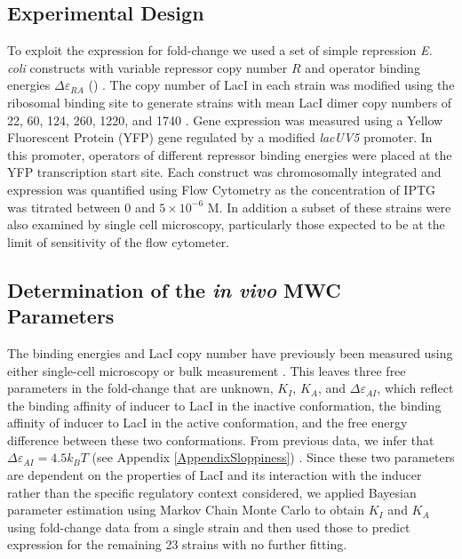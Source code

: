 \subsection*{Experimental Design}

To exploit the expression for fold-change \eref[eq7] we used a set of simple
repression \textit{E. coli} constructs with variable repressor copy number $R$
and operator binding energies $\Delta\varepsilon_{RA}$
(\fref[figpolymeraseRepressorStates]) .  The copy number of LacI in each strain was modified using
the ribosomal binding site to generate strains with mean LacI dimer copy numbers
of 22, 60, 124, 260, 1220, and 1740 \cite{Garcia2011}. Gene expression was
measured using a Yellow Fluorescent Protein (YFP) gene regulated by a modified
\textit{lacUV5} promoter. In this promoter, operators of different repressor
binding energies were placed at the YFP transcription start site. Each construct
was chromosomally integrated and expression was quantified using Flow Cytometry
as the concentration of IPTG was titrated between 0 and $5\times
10^{-6}\,\,\text{M}$. In addition a subset of these strains were also examined
by single cell microscopy, particularly those expected to be at the limit of
sensitivity of the flow cytometer.

\subsection*{Determination of the \textit{in vivo} MWC Parameters}

The binding energies and LacI copy number have previously been measured using
either single-cell microscopy or bulk measurement \cite{Garcia2011,
	Brewster2014}. This leaves three free parameters in the fold-change \eref[eq7]
that are unknown, $K_I$, $K_A$, and $\Delta\varepsilon_{AI}$, which reflect the
binding affinity of inducer to LacI in the inactive conformation, the binding
affinity of inducer to LacI in the active conformation, and the free energy
difference between these two conformations. From previous
data\cite{Brewster2014}, we infer that $\Delta\varepsilon_{AI} = 4.5k_BT$ (see
Appendix \ref{AppendixSloppiness}) . Since these two parameters are dependent on the properties of
LacI and its interaction with the inducer rather than the specific regulatory
context considered, we applied Bayesian parameter estimation using Markov Chain
Monte Carlo to obtain $K_I$ and $K_A$ using fold-change data from a single
strain and then used those to predict expression for the remaining 23 strains
with no further fitting.

